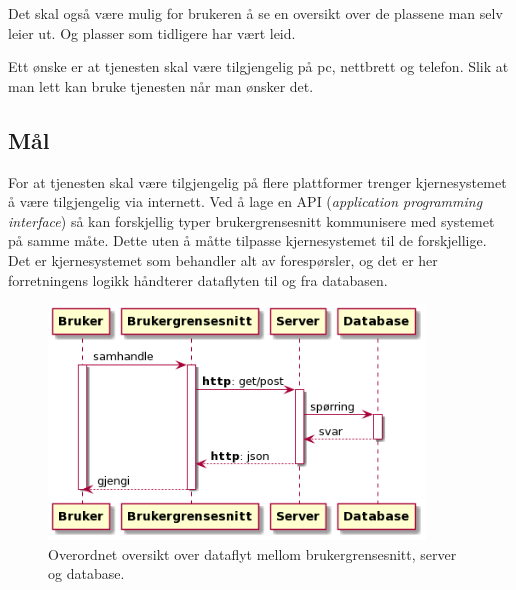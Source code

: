 Det skal også være mulig for brukeren å se en oversikt over de plassene man selv leier ut. Og plasser som tidligere har vært leid.

Ett ønske er at tjenesten skal være tilgjengelig på pc, nettbrett og telefon. Slik at man lett kan bruke tjenesten når man ønsker det.





\subsection{Mål}

For at tjenesten skal være tilgjengelig på flere plattformer trenger kjernesystemet å være tilgjengelig via internett. Ved å lage en API (\textit{application programming interface}) så kan forskjellig typer brukergrensesnitt kommunisere med systemet på samme måte. Dette uten å måtte tilpasse kjernesystemet til de forskjellige. Det er kjernesystemet som behandler alt av forespørsler, og det er her forretningens logikk håndterer dataflyten til og fra databasen.

\begin{figure}[H]
    \centering
    \includegraphics[width=10cm]{bilder/uml/intro_flyt.png}
    \caption{Overordnet oversikt over dataflyt mellom brukergrensesnitt, server og database.}
    \label{fig:lagdeling}
\end{figure}

